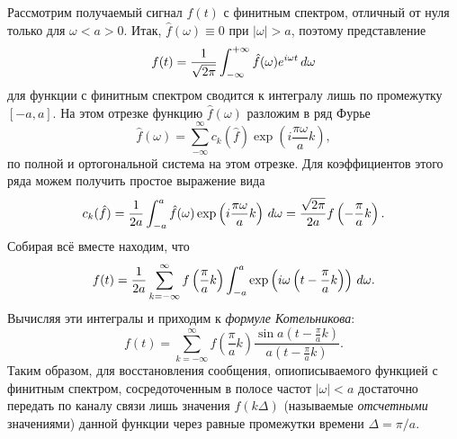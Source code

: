 Рассмотрим получаемый сигнал $f(t)$ с финитным спектром, отличный от нуля только для $\omega < a > 0$. Итак, $\hat{f}(\omega) \equiv 0$ при $|\omega| > a$, поэтому представление
\begin{equation*}
    f(t) = \frac{1}{\sqrt{2\pi}} \int_{-\infty}^{+\infty} \hat{f} (\omega) e^{i \omega t} \, d \omega
\end{equation*}
для функции с финитным спектром сводится к интегралу лишь по промежутку $[-a, a]$. На этом отрезке функцию $\hat{f} (\omega)$ разложим в ряд Фурье
\begin{equation*}
    \hat{f} (\omega) = \sum_{-\infty}^{\infty} c_k (\hat{f}) \exp\left(i \frac{\pi \omega}{a} k\right),
\end{equation*}
по полной и ортогональной система на этом отрезке. Для коэффициентов этого ряда можем получить простое выражение вида
\begin{equation*}
    c_k (\hat{f}) = \frac{1}{2a} \int_{-a}^{a} \hat{f} (\omega)  \exp\left(i \frac{\pi \omega}{a} k\right) \, d \omega = \frac{\sqrt{2\pi}}{2a} f\left(-\frac{\pi}{a}k\right). 
\end{equation*}
Собирая всё вместе находим, что
\begin{equation*}
    f(t) = \frac{1}{2a} \sum_{k=-\infty}^{\infty} f\left(\frac{\pi}{a} k\right) \int_{-a}^{a}  \exp\left(
        i \omega \left(t- \frac{\pi}{a}k \right) 
    \right) \, d \omega.
\end{equation*}
Вычисляя эти интегралы и приходим к \textit{формуле Котельникова}:
\begin{equation*}
    f(t) = \sum_{k=-\infty}^{\infty}  f\left(\frac{\pi}{a}k\right) \frac{\sin a\left(t- \frac{\pi}{a}k \right)}{a \left(t - \frac{\pi}{a} k\right)}.
\end{equation*}
Таким образом, для восстановления сообщения, опиописываемого функцией с финитным спектром, сосредоточенным в
полосе частот $|\omega| < a$ достаточно передать по каналу связи лишь значения $f(k \Delta)$ (называемые \textit{отсчетными} значениями) данной функции через равные промежутки времени $\Delta = \pi/a$. 